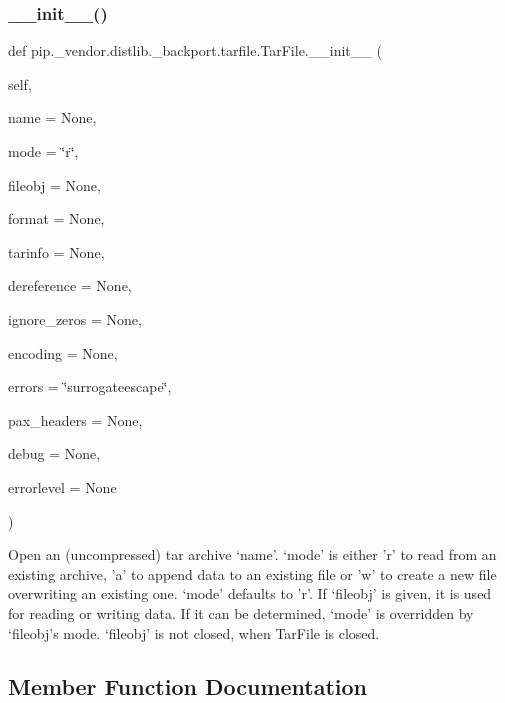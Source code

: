 \subsubsection{\texorpdfstring{\+\_\+\+\_\+init\+\_\+\+\_\+()}{\_\_init\_\_()}}
{\footnotesize\ttfamily def pip.\+\_\+vendor.\+distlib.\+\_\+backport.\+tarfile.\+Tar\+File.\+\_\+\+\_\+init\+\_\+\+\_\+ (\begin{DoxyParamCaption}\item[{}]{self,  }\item[{}]{name = {\ttfamily None},  }\item[{}]{mode = {\ttfamily \char`\"{}r\char`\"{}},  }\item[{}]{fileobj = {\ttfamily None},  }\item[{}]{format = {\ttfamily None},  }\item[{}]{tarinfo = {\ttfamily None},  }\item[{}]{dereference = {\ttfamily None},  }\item[{}]{ignore\+\_\+zeros = {\ttfamily None},  }\item[{}]{encoding = {\ttfamily None},  }\item[{}]{errors = {\ttfamily \char`\"{}surrogateescape\char`\"{}},  }\item[{}]{pax\+\_\+headers = {\ttfamily None},  }\item[{}]{debug = {\ttfamily None},  }\item[{}]{errorlevel = {\ttfamily None} }\end{DoxyParamCaption})}

\begin{DoxyVerb}Open an (uncompressed) tar archive `name'. `mode' is either 'r' to
   read from an existing archive, 'a' to append data to an existing
   file or 'w' to create a new file overwriting an existing one. `mode'
   defaults to 'r'.
   If `fileobj' is given, it is used for reading or writing data. If it
   can be determined, `mode' is overridden by `fileobj's mode.
   `fileobj' is not closed, when TarFile is closed.
\end{DoxyVerb}
 

\subsection{Member Function Documentation}
\mbox{\label{classpip_1_1__vendor_1_1distlib_1_1__backport_1_1tarfile_1_1TarFile_af127c326dc5340cf88354fbbf4c6bcb1}} 
